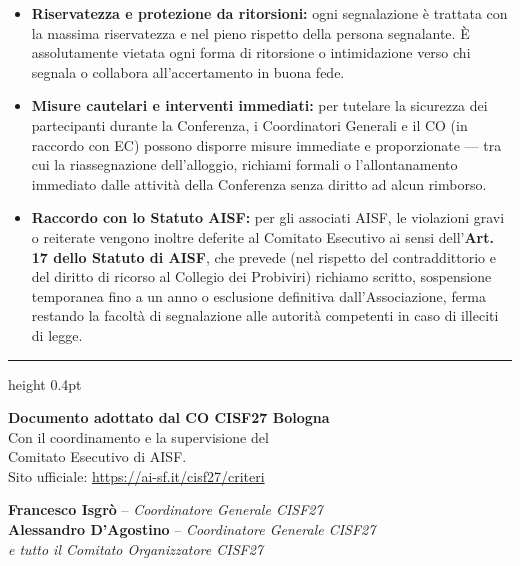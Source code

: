 \documentclass[10pt,a4paper]{article}
\begin{document}
\begin{itemize}
  \item \textbf{Riservatezza e protezione da ritorsioni:} ogni segnalazione è trattata con la massima riservatezza e nel pieno rispetto della persona segnalante. È assolutamente vietata ogni forma di ritorsione o intimidazione verso chi segnala o collabora all'accertamento in buona fede.
  \item \textbf{Misure cautelari e interventi immediati:} per tutelare la sicurezza dei partecipanti durante la Conferenza, i Coordinatori Generali e il CO (in raccordo con EC) possono disporre misure immediate e proporzionate --- tra cui la riassegnazione dell'alloggio, richiami formali o l'allontanamento immediato dalle attività della Conferenza senza diritto ad alcun rimborso.
  \item \textbf{Raccordo con lo Statuto AISF:} per gli associati AISF, le violazioni gravi o reiterate vengono inoltre deferite al Comitato Esecutivo ai sensi dell'\textbf{Art.\,17 dello Statuto di AISF}, che prevede (nel rispetto del contraddittorio e del diritto di ricorso al Collegio dei Probiviri) richiamo scritto, sospensione temporanea fino a un anno o esclusione definitiva dall'Associazione, ferma restando la facoltà di segnalazione alle autorità competenti in caso di illeciti di legge.
\end{itemize}

\vspace{0.05cm}
\hrule height 0.4pt
\vspace{0.15cm}

\noindent
\begin{minipage}[b]{0.48\textwidth}
  \footnotesize\color{cisfMuted}
  \textbf{Documento adottato dal CO CISF27 Bologna}\\
  Con il coordinamento e la supervisione del\\
  Comitato Esecutivo di AISF.\\[0.25em]
  Sito ufficiale: \href{https://ai-sf.it/cisf27/criteri}{https://ai-sf.it/cisf27/criteri}
\end{minipage}
\hfill
\begin{minipage}[b]{0.48\textwidth}
  \begin{flushright}
    \small
    \textbf{Francesco Isgrò} -- \textit{Coordinatore Generale CISF27}\\
    \textbf{Alessandro D'Agostino} -- \textit{Coordinatore Generale CISF27}\\
    \textit{e tutto il Comitato Organizzatore CISF27}
  \end{flushright}
\end{minipage}
\end{document}
